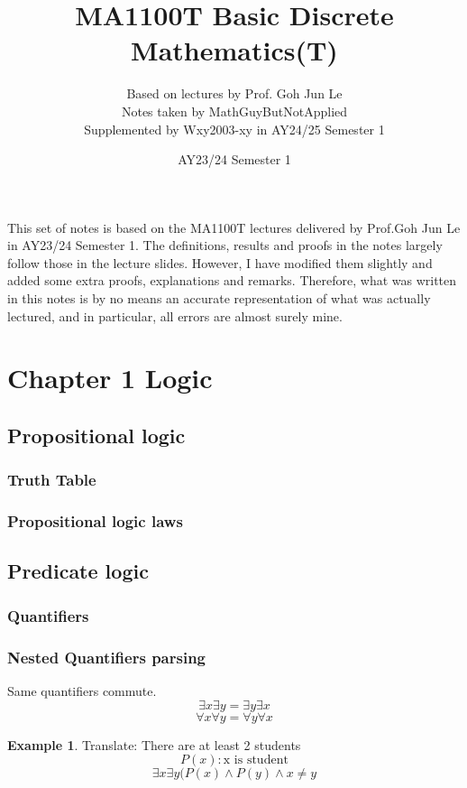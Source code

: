 \documentclass[14pt]{article}
\title{
MA1100T Basic Discrete Mathematics(T)}
\author{Based on lectures by Prof. Goh Jun Le \\Notes taken by  MathGuyButNotApplied \\Supplemented by Wxy2003-xy in AY24/25 Semester 1}
\date{AY23/24 Semester 1}
\theoremstyle{definition}
\newtheorem*{example}{Example}
\begin{document}
\maketitle

This set of notes is based on the MA1100T lectures delivered by Prof.Goh Jun Le in AY23/24 Semester
1. The definitions, results and proofs in the notes largely follow those in the lecture slides. However, I
have modified them slightly and added some extra proofs, explanations and remarks. Therefore, what was written in this notes is by no means an accurate representation of what was actually lectured, and in particular, all errors are almost surely mine.

\newpage

\tableofcontents

\section{Chapter 1 Logic}
\subsection{Propositional logic}
\subsubsection{Truth Table}
\subsubsection{Propositional logic laws}

\subsection{Predicate logic}
\subsubsection{Quantifiers}
\subsubsection{Nested Quantifiers parsing}
Same quantifiers commute.
\[\exists x \exists y = \exists y \exists x\]
\[\forall x \forall y = \forall y \forall x\]
\begin{example}    
Translate: There are at least 2 students
\[P(x): \text{x is student}\]
\[\exists x \exists y(P(x) \land P(y) \land x \neq y\]
\end{example}
\end{document}
